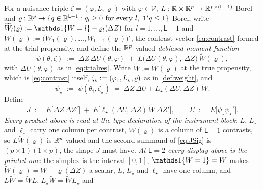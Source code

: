 
\begin{definition}\label{def:moment}
For a nuisance triple $\zeta=(\varphi,L,\varrho)$ with $\varphi\in\mathcal V$,
$L:\mathbb{R}\times\mathbb{R}^{p}\to\mathbb{R}^{p\times(\mathsf L-1)}$ Borel and
$\varrho:\IR^{p}\to\{q\in\IR^{\mathsf L-1}:q_l\ge0\ \text{for every }l,\ \mathbf 1'q\le1\}$ Borel, write
$\widetilde W_l(\varrho):=\un\{W=l\}-\varrho_l(\Delta Z)$ for $l=1,\dots,\mathsf L-1$ and
$\widetilde W(\varrho):=\big(\widetilde W_1(\varrho),\dots,\widetilde W_{\mathsf L-1}(\varrho)\big)'$, the
contrast vector \eqref{eq:contrast} formed at the trial propensity, and define the
$\mathbb{R}^{p}$-valued \emph{debiased moment function}
\begin{equation}\label{eq:psidef}
\psi(\theta,\zeta)\;:=\;\Delta Z\,\Delta U(\theta,\varphi)\;+\;
L\big(\Delta U(\theta,\varphi),\,\Delta Z\big)\,\widetilde W(\varrho),
\end{equation}
with $\Delta U(\theta,\varphi)$ as in \eqref{eq:trialres}. Write $\widetilde W:=\widetilde W(\varrho)$ at the
true propensity, which is \eqref{eq:contrast} itself,
$\zeta_\star:=(\varphi_{\dagger},L_\star,\varrho)$ as in \cref{def:weight}, and
\begin{equation}\label{eq:psistar}
\psi_\star\;:=\;\psi(\theta_\dagger,\zeta_\star)\;=\;\Delta Z\,\Delta U+L_\star(\Delta U,\Delta Z)\,\widetilde W.
\end{equation}
Define
\begin{equation}\label{eq:JSig}
J\;:=\;E\big[\Delta Z\,\Delta Z'\big]\;+\;E\big[\ell_\star(\Delta U,\Delta Z)\,\widetilde W\,\Delta Z'\big],
\qquad
\Sigma\;:=\;E\big[\psi_\star\psi_\star'\big] .
\end{equation}
\emph{Every product above is read at the type declaration of the instrument block}: $L$, $L_\star$ and
$\ell_\star$ carry one column per contrast, $\widetilde W(\varrho)$ is a column of $\mathsf L-1$ contrasts,
so $L\widetilde W(\varrho)$ is $\mathbb{R}^{p}$-valued and the second summand of \eqref{eq:JSig} is
$(p\times1)(1\times p)$, the shape $J$ must have. \emph{At $\mathsf L=2$ every display above is the printed
one}: the simplex is the interval $[0,1]$, $\un\{W=1\}=W$ makes
$\widetilde W(\varrho)=W-\varrho(\Delta Z)$ a scalar, $L$, $L_\star$ and $\ell_\star$ have one column, and
$L\widetilde W=\widetilde WL$, $L_\star\widetilde W=\widetilde WL_\star$ and

\end{definition}
